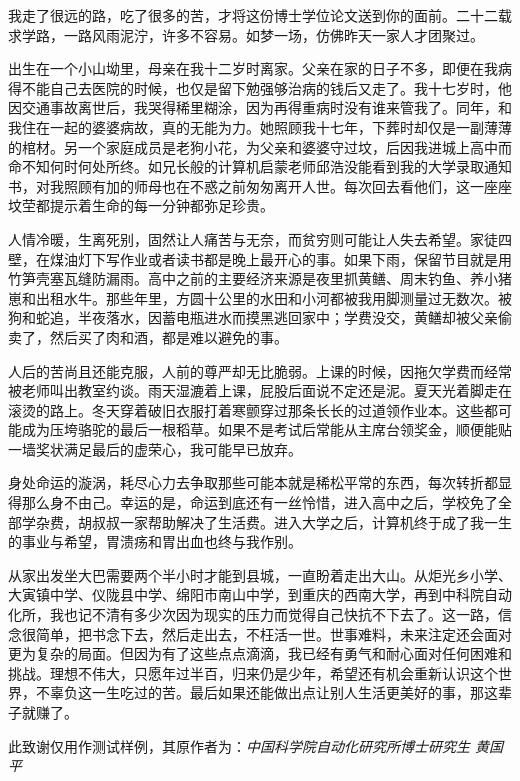 \begin{acknowledgment}
我走了很远的路，吃了很多的苦，才将这份博士学位论文送到你的面前。二十二载求学路，一路风雨泥泞，许多不容易。如梦一场，仿佛昨天一家人才团聚过。

出生在一个小山坳里，母亲在我十二岁时离家。父亲在家的日子不多，即便在我病得不能自己去医院的时候，也仅是留下勉强够治病的钱后又走了。我十七岁时，他因交通事故离世后，我哭得稀里糊涂，因为再得重病时没有谁来管我了。同年，和我住在一起的婆婆病故，真的无能为力。她照顾我十七年，下葬时却仅是一副薄薄的棺材。另一个家庭成员是老狗小花，为父亲和婆婆守过坟，后因我进城上高中而命不知何时何处所终。如兄长般的计算机启蒙老师邱浩没能看到我的大学录取通知书，对我照顾有加的师母也在不惑之前匆匆离开人世。每次回去看他们，这一座座坟茔都提示着生命的每一分钟都弥足珍贵。

人情冷暖，生离死别，固然让人痛苦与无奈，而贫穷则可能让人失去希望。家徒四壁，在煤油灯下写作业或者读书都是晚上最开心的事。如果下雨，保留节目就是用竹笋壳塞瓦缝防漏雨。高中之前的主要经济来源是夜里抓黄鳝、周末钓鱼、养小猪崽和出租水牛。那些年里，方圆十公里的水田和小河都被我用脚测量过无数次。被狗和蛇追，半夜落水，因蓄电瓶进水而摸黑逃回家中；学费没交，黄鳝却被父亲偷卖了，然后买了肉和酒，都是难以避免的事。

人后的苦尚且还能克服，人前的尊严却无比脆弱。上课的时候，因拖欠学费而经常被老师叫出教室约谈。雨天湿漉着上课，屁股后面说不定还是泥。夏天光着脚走在滚烫的路上。冬天穿着破旧衣服打着寒颤穿过那条长长的过道领作业本。这些都可能成为压垮骆驼的最后一根稻草。如果不是考试后常能从主席台领奖金，顺便能贴一墙奖状满足最后的虚荣心，我可能早已放弃。

身处命运的漩涡，耗尽心力去争取那些可能本就是稀松平常的东西，每次转折都显得那么身不由己。幸运的是，命运到底还有一丝怜惜，进入高中之后，学校免了全部学杂费，胡叔叔一家帮助解决了生活费。进入大学之后，计算机终于成了我一生的事业与希望，胃溃疡和胃出血也终与我作别。

从家出发坐大巴需要两个半小时才能到县城，一直盼着走出大山。从炬光乡小学、大寅镇中学、仪陇县中学、绵阳市南山中学，到重庆的西南大学，再到中科院自动化所，我也记不清有多少次因为现实的压力而觉得自己快抗不下去了。这一路，信念很简单，把书念下去，然后走出去，不枉活一世。世事难料，未来注定还会面对更为复杂的局面。但因为有了这些点点滴滴，我已经有勇气和耐心面对任何困难和挑战。理想不伟大，只愿年过半百，归来仍是少年，希望还有机会重新认识这个世界，不辜负这一生吃过的苦。最后如果还能做出点让别人生活更美好的事，那这辈子就赚了。

此致谢仅用作测试样例，其原作者为：\emph{中国科学院自动化研究所博士研究生 \quad 黄国平} 
\end{acknowledgment}




